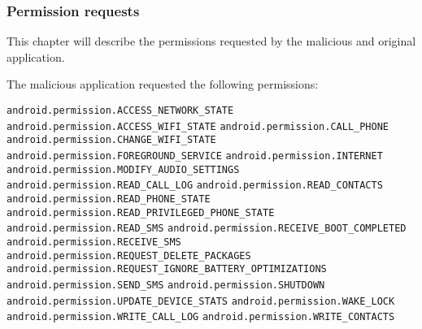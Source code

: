 \subsubsection{Permission requests}

This chapter will describe the permissions requested by the malicious and original application.

The malicious application requested the following permissions:

\texttt{android.permission.ACCESS\_NETWORK\_STATE}
\newline \texttt{android.permission.ACCESS\_WIFI\_STATE}
\newline \texttt{android.permission.CALL\_PHONE}
\newline \texttt{android.permission.CHANGE\_WIFI\_STATE}
\newline \texttt{android.permission.FOREGROUND\_SERVICE}
\newline \texttt{android.permission.INTERNET}
\newline \texttt{android.permission.MODIFY\_AUDIO\_SETTINGS}
\newline \texttt{android.permission.READ\_CALL\_LOG}
\newline \texttt{android.permission.READ\_CONTACTS}
\newline \texttt{android.permission.READ\_PHONE\_STATE}
\newline \texttt{android.permission.READ\_PRIVILEGED\_PHONE\_STATE}
\newline \texttt{android.permission.READ\_SMS}
\newline \texttt{android.permission.RECEIVE\_BOOT\_COMPLETED}
\newline \texttt{android.permission.RECEIVE\_SMS}
\newline \texttt{android.permission.REQUEST\_DELETE\_PACKAGES}
\newline \texttt{android.permission.REQUEST\_IGNORE\_BATTERY\_OPTIMIZATIONS}
\newline \texttt{android.permission.SEND\_SMS}
\newline \texttt{android.permission.SHUTDOWN}
\newline \texttt{android.permission.UPDATE\_DEVICE\_STATS}
\newline \texttt{android.permission.WAKE\_LOCK}
\newline \texttt{android.permission.WRITE\_CALL\_LOG}
\newline \texttt{android.permission.WRITE\_CONTACTS}

